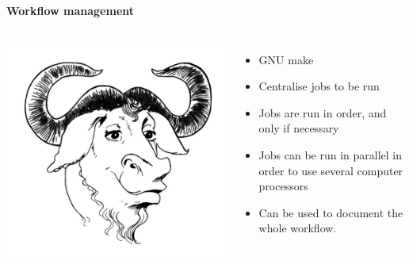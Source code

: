 \documentclass[9pt,xcolor=pdftex,dvipsnames,table]{beamer}
\begin{document}
\begin{frame}{\textbf{Workflow management}}
\begin{columns}
\centering
\includegraphics[width=1\textwidth]{images/make-logo.jpg}
  \begin{itemize}
  \item GNU make
  \item Centralise jobs to be run
  \item Jobs are run in order, and only if necessary
  \item Jobs can be run in parallel in order to use several computer processors
  \item Can be used to document the whole workflow.
  \end{itemize}
\end{columns}
\end{frame}
\end{document}

